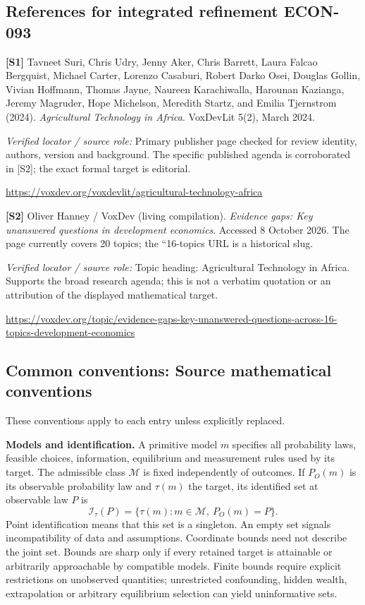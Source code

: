 \documentclass[11pt,a4paper]{article}
\begin{document}
\subsection*{References for integrated refinement ECON-093}
{\footnotesize\raggedright
\par\noindent\textbf{[S1]} Tavneet Suri, Chris Udry, Jenny Aker, Chris Barrett, Laura Falcao Bergquist, Michael Carter, Lorenzo Casaburi, Robert Darko Osei, Douglas Gollin, Vivian Hoffmann, Thomas Jayne, Naureen Karachiwalla, Harounan Kazianga, Jeremy Magruder, Hope Michelson, Meredith Startz, and Emilia Tjernstrom (2024). \emph{Agricultural Technology in Africa}. VoxDevLit 5(2), March 2024.\par \textit{Verified locator / source role:} Primary publisher page checked for review identity, authors, version and background. The specific published agenda is corroborated in [S2]; the exact formal target is editorial.\par \url{https://voxdev.org/voxdevlit/agricultural-technology-africa}\par\smallskip
\par\noindent\textbf{[S2]} Oliver Hanney / VoxDev (living compilation). \emph{Evidence gaps: Key unanswered questions in development economics}. Accessed 8 October 2026. The page currently covers 20 topics; the ``16-topics URL is a historical slug.\par \textit{Verified locator / source role:} Topic heading: Agricultural Technology in Africa. Supports the broad research agenda; this is not a verbatim quotation or an attribution of the displayed mathematical target.\par \url{https://voxdev.org/topic/evidence-gaps-key-unanswered-questions-across-16-topics-development-economics}\par\smallskip
}

\subsection*{Common conventions: Source mathematical conventions}

These conventions apply to each entry unless explicitly replaced.

\textbf{Models and identification.} A primitive model \(m\) specifies all probability laws, feasible choices, information, equilibrium and measurement rules used by its target. The admissible class \(\mathcal M\) is fixed independently of outcomes. If \(P_O(m)\) is its observable probability law and \(\tau(m)\) the target, its identified set at observable law \(P\) is
\[
 \mathcal I_\tau(P)=\{\tau(m):m\in\mathcal M,\ P_O(m)=P\}.
\]
Point identification means that this set is a singleton. An empty set signals incompatibility of data and assumptions. Coordinate bounds need not describe the joint set. Bounds are sharp only if every retained target is attainable or arbitrarily approachable by compatible models. Finite bounds require explicit restrictions on unobserved quantities; unrestricted confounding, hidden wealth, extrapolation or arbitrary equilibrium selection can yield uninformative sets.
\end{document}
